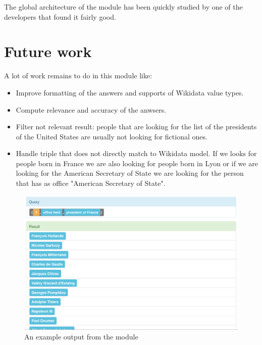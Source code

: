 The global architecture of the module has been quickly studied by one of the \Wikidata developers that found it fairly good.

\section{Future work}
A lot of work remains to do in this module like:
\begin{itemize}
    \item Improve formatting of the answers and supports of Wikidata value types.
    \item Compute relevance and accuracy of the anwsers.
    \item Filter not relevant result: people that are looking for the list of the presidents of the United States are usually not looking for fictional ones.
    \item Handle triple that does not directly match to Wikidata model. If we looks for people born in France we are also looking for people born in Lyon or if we are looking for the American Secretary of State we are looking for the person that has as office "American Secretary of State".
\end{itemize}

\begin{figure}[!ht]
  \centering
    \label{wikidata:struct}
    \caption{An example output from the \Wikidata module}
    \includegraphics[width=\textwidth]{./wikidata_list_presidents.png}
\end{figure}
